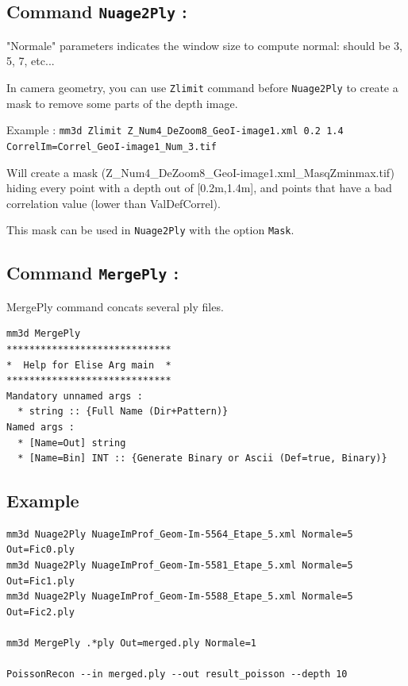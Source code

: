 \subsection{Command {\tt Nuage2Ply} :}

"Normale" parameters indicates the window size to compute normal: should be 3, 5, 7, etc...


In camera geometry, you can use {\tt Zlimit} command before {\tt Nuage2Ply} to create a mask to remove some parts of the depth image.

Example :
{\tt mm3d Zlimit Z\_Num4\_DeZoom8\_GeoI-image1.xml 0.2 1.4 CorrelIm=Correl\_GeoI-image1\_Num\_3.tif}

Will create a mask (Z\_Num4\_DeZoom8\_GeoI-image1.xml\_MasqZminmax.tif) hiding every point with a depth out of [0.2m,1.4m], and points that have a bad correlation value (lower than ValDefCorrel).

This mask can be used in {\tt Nuage2Ply} with the option {\tt Mask}.



\subsection{Command {\tt MergePly} :}

MergePly command concats several ply files.

\begin{verbatim}
mm3d MergePly
*****************************
*  Help for Elise Arg main  *
*****************************
Mandatory unnamed args :
  * string :: {Full Name (Dir+Pattern)}
Named args :
  * [Name=Out] string
  * [Name=Bin] INT :: {Generate Binary or Ascii (Def=true, Binary)}
\end{verbatim}

\subsection{Example}

\begin{verbatim}
mm3d Nuage2Ply NuageImProf_Geom-Im-5564_Etape_5.xml Normale=5 Out=Fic0.ply
mm3d Nuage2Ply NuageImProf_Geom-Im-5581_Etape_5.xml Normale=5 Out=Fic1.ply
mm3d Nuage2Ply NuageImProf_Geom-Im-5588_Etape_5.xml Normale=5 Out=Fic2.ply

mm3d MergePly .*ply Out=merged.ply Normale=1

PoissonRecon --in merged.ply --out result_poisson --depth 10
\end{verbatim}

